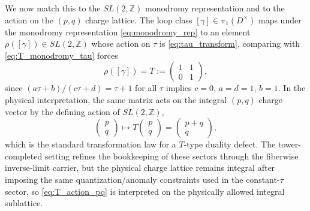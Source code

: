 \documentclass[11pt]{article}
\theoremstyle{remark}
\begin{document}
We now match this to the $SL(2,\mathbb{Z})$ monodromy representation and to the action on the $(p,q)$ charge lattice. The loop class $[\gamma]\in\pi_1(D^\times)$ maps under the monodromy representation \eqref{eq:monodromy_rep} to an element $\rho([\gamma])\in SL(2,\mathbb{Z})$ whose action on $\tau$ is \eqref{eq:tau_transform}, comparing with \eqref{eq:T_monodromy_tau} forces
\begin{equation}\label{eq:T_matrix}
\rho([\gamma])=T:=\begin{pmatrix}1&1\\ 0&1\end{pmatrix},
\end{equation}
since $(a\tau+b)/(c\tau+d)=\tau+1$ for all $\tau$ implies $c=0$, $a=d=1$, $b=1$. In the physical interpretation, the same matrix acts on the integral $(p,q)$ charge vector by the defining action of $SL(2,\mathbb{Z})$,
\begin{equation}\label{eq:T_action_pq}
\begin{pmatrix}p\\ q\end{pmatrix}\longmapsto T\begin{pmatrix}p\\ q\end{pmatrix}=\begin{pmatrix}p+q\\ q\end{pmatrix},
\end{equation}
which is the standard transformation law for a $T$-type duality defect. The tower-completed setting refines the bookkeeping of these sectors through the fiberwise inverse-limit carrier, but the physical charge lattice remains integral after imposing the same quantization/anomaly constraints used in the constant-$\tau$ sector, so \eqref{eq:T_action_pq} is interpreted on the physically allowed integral sublattice.
\end{document}
